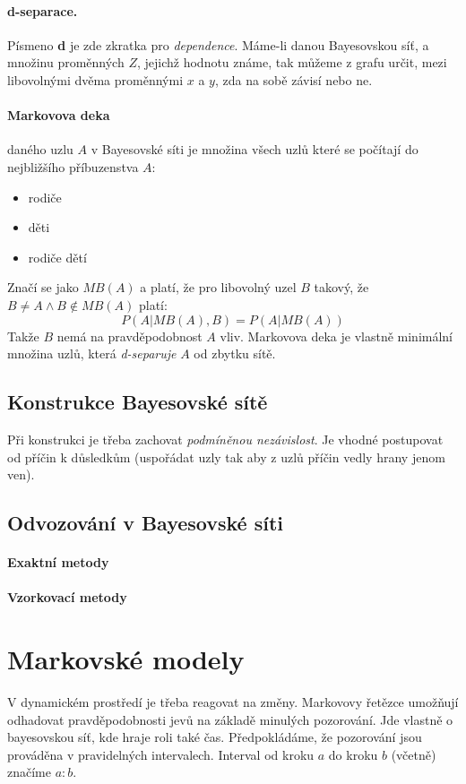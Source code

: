 \documentclass[a4paper]{article}      %
\begin{document}
\paragraph{d-separace.} Písmeno \textbf{d} je zde zkratka pro \emph{dependence}.
Máme-li danou Bayesovskou síť, a množinu proměnných $Z$, jejichž hodnotu známe, tak můžeme z grafu určit,
mezi libovolnými dvěma proměnnými $x$ a $y$, zda na sobě závisí nebo ne.

\paragraph{Markovova deka} daného uzlu $A$ v Bayesovské síti je množina všech uzlů které se počítají do nejbližšího příbuzenstva $A$:
\begin{itemize}
\item rodiče
\item děti
\item rodiče dětí
\end{itemize}
Značí se jako $MB(A)$ a platí, že pro libovolný uzel $B$ takový, že $B \neq A \wedge B\notin MB(A)$ platí:
\[
P(A|MB(A),B) = P(A|MB(A)) 
\]
Takže $B$ nemá na pravděpodobnost $A$ vliv. Markovova deka je vlastně minimální množina uzlů, která \emph{d-separuje} $A$ od zbytku sítě. 

\subsection{Konstrukce Bayesovské sítě}
Při konstrukci je třeba zachovat \emph{podmíněnou nezávislost}.
Je vhodné postupovat od příčin k důsledkům (uspořádat uzly tak aby z uzlů příčin vedly hrany jenom ven).

\subsection{Odvozování v Bayesovské síti}
\paragraph{Exaktní metody}
\paragraph{Vzorkovací metody}

\section{Markovské modely}
V dynamickém prostředí je třeba reagovat na změny.
Markovovy řetězce umožňují odhadovat pravděpodobnosti jevů na základě minulých pozorování.
Jde vlastně o bayesovskou síť, kde hraje roli také čas.
Předpokládáme, že pozorování jsou prováděna v pravidelných intervalech. Interval od kroku $a$ do kroku $b$ (včetně) značíme $a:b$.
\end{document}
